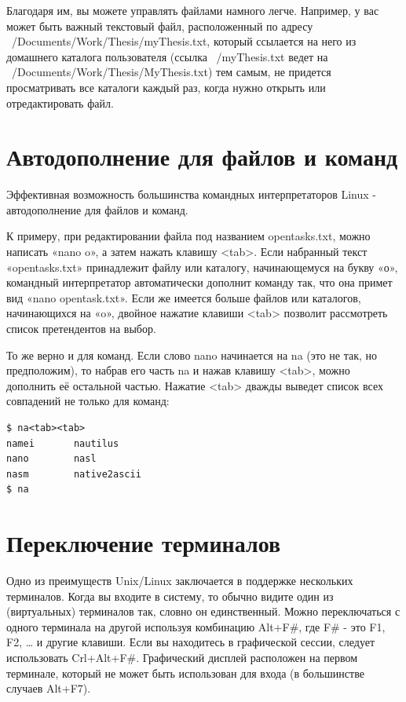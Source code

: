 \documentclass[10pt]{book}
\begin{document}
Благодаря им, вы можете управлять файлами намного легче. Например, у вас может быть важный текстовый файл, расположенный по адресу  ~/Documents/Work/\break{}Thesis/myThesis.txt, который ссылается на него из домашнего каталога пользователя (ссылка ~/myThesis.txt ведет на ~/Documents/Work/Thesis/MyThesis.txt) тем самым, не придется просматривать все каталоги каждый раз, когда нужно открыть или отредактировать файл. 

\section{Автодополнение для файлов и команд}

Эффективная возможность большинства командных интерпретаторов Linux - автодополнение для файлов и команд.

\sloppy К примеру, при редактировании файла под названием opentasks.txt, можно написать «nano o», а затем нажать клавишу <tab>. Если набранный текст «opentasks.txt» принадлежит файлу или каталогу, начинающемуся на букву «о», командный интерпретатор автоматически дополнит команду так, что она примет вид «nano opentask.txt». Если же имеется больше файлов или каталогов, начинающихся на «o», двойное нажатие клавиши <tab> позволит рассмотреть список претендентов на выбор.

То же верно и для команд. Если слово nano начинается на na (это не так, но предположим), то набрав его часть na и нажав клавишу <tab>, можно дополнить её остальной частью. Нажатие <tab> дважды выведет список всех совпадений не только для команд: 

\vspace{3mm}
\begin{tcolorbox}
\begin{lstlisting}
$ na<tab><tab>
namei		nautilus
nano		nasl
nasm		native2ascii
$ na
\end{lstlisting}
\end{tcolorbox}

\section{Переключение терминалов}

Одно из преимуществ Unix/Linux заключается в поддержке нескольких терминалов. Когда вы входите в систему, то обычно видите один из (виртуальных) терминалов так, словно он единственный. Можно переключаться с одного терминала на другой используя комбинацию Alt+F\#, где F\# - это F1, F2, … и другие клавиши. Если вы находитесь в графической сессии, следует использовать Crl+Alt+F\#. Графический дисплей расположен на первом терминале, который не может быть использован для входа (в большинстве случаев Alt+F7).
\end{document}
